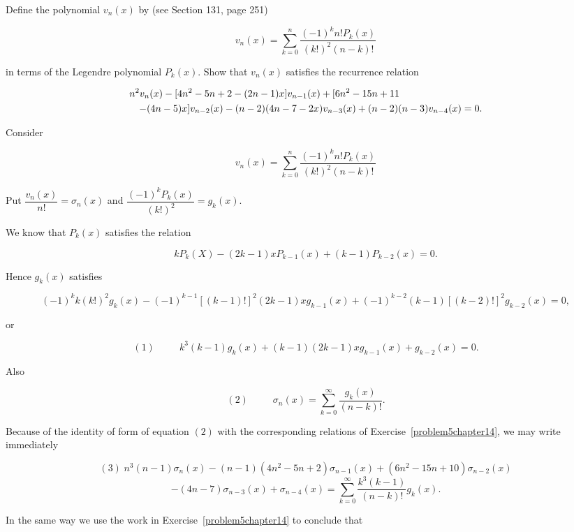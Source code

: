 \begin{problem}\label{problem7chapter14}
Define the polynomial $v_n(x)$ by (see Section 131, page 251)

$$v_n(x) = \displaystyle\sum_{k=0}^n \dfrac{(-1)^k n! P_k(x)}{(k!)^2 (n-k)!}$$

in terms of the Legendre polynomial $P_k(x)$. Show that $v_n(x)$ satisfies the recurrence relation

\begin{eqnarray*}
\lefteqn{n^2v_n(x) - [4n^2-5n+2-(2n-1)x]v_{n-1}(x) + [6n^2-15n+11} \\
&&-(4n-5)x]v_{n-2}(x) - (n-2)(4n-7-2x)v_{n-3}(x)+(n-2)(n-3)v_{n-4}(x)=0.
\end{eqnarray*}
\end{problem}
\begin{solution}
Consider

$$v_n(x) = \displaystyle\sum_{k=0}^n \dfrac{(-1)^k n! P_k(x)}{(k!)^2(n-k)!}$$

Put $\dfrac{v_n(x)}{n!} = \sigma_n(x)$ and $\dfrac{(-1)^k P_k(x)}{(k!)^2} = g_k(x).$

We know that $P_k(x)$ satisfies the relation

$$k P_k(X) - (2k-1)x P_{k-1}(x) + (k-1)P_{k-2}(x) = 0.$$

Hence $g_k(x)$ satisfies

$$(-1)^k k (k!)^2 g_k(x) - (-1)^{k-1}[(k-1)!]^2 (2k-1)xg_{k-1}(x) + (-1)^{k-2}(k-1)[(k-2)!]^2g_{k-2}(x)=0,$$

or

$$(1) \hspace{30pt} k^3(k-1)g_k(x) + (k-1)(2k-1)xg_{k-1}(x) + g_{k-2}(x) =0.$$

Also

$$(2)\hspace{30pt} \sigma_n(x) = \displaystyle\sum_{k=0}^{\infty} \dfrac{g_k(x)}{(n-k)!}.$$

Because of the identity of form of equation $(2)$ with the corresponding relations of Exercise~\ref{problem5chapter14}, we may write immediately

$$(3) \hspace{3pt} n^3(n-1)\sigma_n(x) - (n-1)(4n^2-5n+2)\sigma_{n-1}(x) + (6n^2-15n+10)\sigma_{n-2}(x)$$
$$-(4n-7)\sigma_{n-3}(x) + \sigma_{n-4}(x) = \displaystyle\sum_{k=0}^{\infty} \dfrac{k^3(k-1)}{(n-k)!} g_k(x).$$

In the same way we use the work in Exercise~\ref{problem5chapter14} to conclude that


\end{solution}
